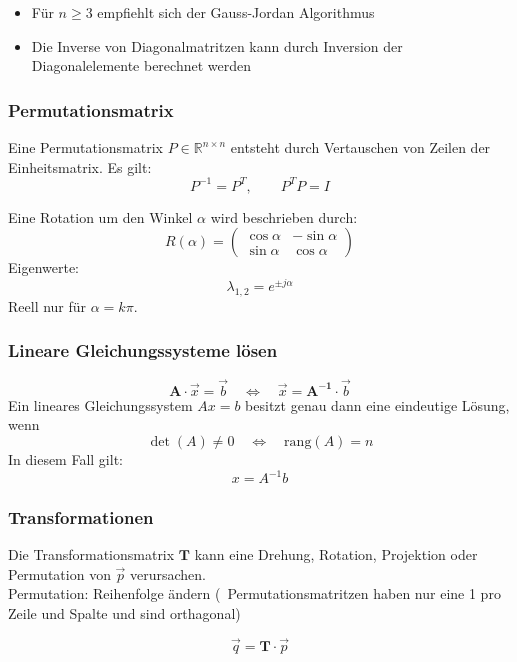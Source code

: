 \smallskip

\begin{itemize}
    \item Für $n \geq 3$ empfiehlt sich der Gauss-Jordan Algorithmus
    \item Die Inverse von Diagonalmatritzen kann durch Inversion der Diagonalelemente berechnet werden
\end{itemize}
\subsubsection{Permutationsmatrix}

Eine Permutationsmatrix $P \in \mathbb{R}^{n \times n}$ entsteht durch Vertauschen von
Zeilen der Einheitsmatrix. Es gilt:
\[
P^{-1} = P^T, \qquad P^T P = I
\]

Eine Rotation um den Winkel $\alpha$ wird beschrieben durch:
\[
R(\alpha) =
\begin{pmatrix}
\cos\alpha & -\sin\alpha \\
\sin\alpha & \cos\alpha
\end{pmatrix}
\]
Eigenwerte:
\[
\lambda_{1,2} = e^{\pm j\alpha}
\]
Reell nur für $\alpha = k\pi$.

\subsubsection{Lineare Gleichungssysteme lösen}

\vspace{-0.2cm}

$$ \bm{A} \cdot \vec{x} = \vec{b} \quad \Leftrightarrow \quad \vec{x} = \bm{A^{-1}} \cdot \vec{b} $$
Ein lineares Gleichungssystem $A x = b$ besitzt genau dann eine eindeutige Lösung, wenn
\[
\det(A) \neq 0 \quad \Leftrightarrow \quad \mathrm{rang}(A) = n
\]
In diesem Fall gilt:
\[
x = A^{-1} b
\]
\subsubsection{Transformationen}

\begin{minipage}[c]{0.7\columnwidth}
    \raggedright
    Die Transformationsmatrix $\bm{T}$ kann eine Drehung, Rotation, Projektion oder Permutation von $\vec{p}$ verursachen. \\
    Permutation: Reihenfolge ändern (\textrightarrow\ Permutationsmatritzen haben nur eine 1 pro Zeile und Spalte und sind orthagonal)
\end{minipage}
\hfill
\begin{minipage}[c]{0.25\columnwidth}
    $$ \vec{q} = \bm{T} \cdot \vec{p} $$
\end{minipage}



